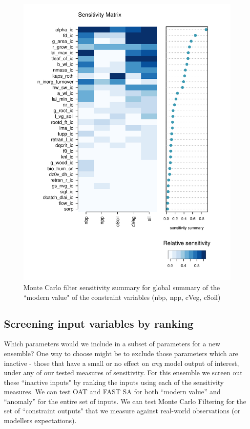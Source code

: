 \documentclass[gmd, manuscript]{copernicus}
\begin{document}
\begin{figure}[t]
\includegraphics[width=12cm]{./figs/fig10.pdf}
\caption{Monte Carlo filter sensitivity summary for global summary of the ``modern value" of the constraint variables (nbp, npp, cVeg, cSoil)}
\label{fig:MCF_sensmat_Yconst_level1a_wave01}
\end{figure}

\subsection{Screening input variables by  ranking}\label{ssec:sa_ranking}

Which parameters would we include in a subset of parameters for a new ensemble?  One way to choose might be to exclude those parameters which are inactive - those that have a small or no effect on \emph{any} model output of interest, under any of our tested measures of sensitivity. For this ensemble we screen out these ``inactive inputs" by ranking the inputs using each of the sensitivity measures. We can test OAT and FAST SA for both ``modern value'' and ``anomaly'' for the entire set of inputs. We can test Monte Carlo Filtering for the set of ``constraint outputs" that we measure against real-world observations (or modellers expectations).
\end{document}
